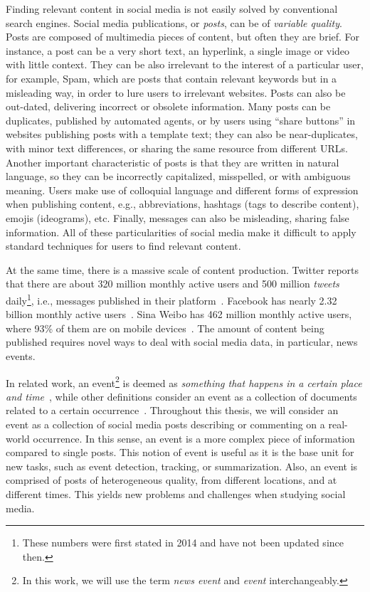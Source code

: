 Finding relevant content in social media is not easily solved by conventional
search engines.
%
Social media publications, or {\em posts}, can be of {\em variable quality}.
%
Posts are composed of multimedia pieces of content, but often they are brief.
%
For instance, a post can be a very short text, an hyperlink, a single image or
video with little context.
%
They can be also irrelevant to the interest of a particular user, for example,
Spam, which are posts that contain relevant keywords but in a misleading way, in
order to lure users to irrelevant websites. 
%
Posts can also be out-dated, delivering incorrect or obsolete information. 
%
Many posts can be duplicates, published by automated agents, or by users
using ``share buttons'' in websites publishing posts with a template text; 
%
they can also be near-duplicates, with minor text differences, or sharing the
same resource from different URLs.
%
Another important characteristic of posts is that they are written in natural
language, so they can be incorrectly capitalized, misspelled, or with ambiguous
meaning.
%
Users make use of colloquial language and different forms of expression when
publishing content, e.g., abbreviations, hashtags (tags to describe content),
emojis (ideograms), etc.
%
Finally, messages can also be misleading, sharing false information.
%
All of these particularities of social media make it difficult to apply standard
techniques for users to find relevant content.


At the same time, there is a massive scale of content production.
%
Twitter reports that there are about 320 million monthly active users and 500
million {\em tweets} daily\footnote{These numbers were first stated in 2014 and
have not been updated since then.}, i.e., messages published in their
platform~\cite{twitter2014}. 
%
Facebook has nearly 2.32 billion monthly active users~\cite{fbnewsroom}. 
%
Sina Weibo has 462 million monthly active users, where 93\% of them are on
mobile devices~\cite{chinawatch}.
%
The amount of content being published requires novel ways to deal with social
media data, in particular, news events.



%
In related work, an event\footnote{In this work, we will use the term {\em news
event} and {\em event} interchangeably.} is deemed as {\em something that happens
in a certain place and time}~\cite{yang1999learning}, while other definitions
consider an event as a collection of documents related to a certain
occurrence~\cite{Becker:2010:LSM:1718487.1718524}.
%
Throughout this thesis, we will consider an event as a collection of
social media posts describing or commenting on a real-world occurrence.
%
In this sense, an event is a more complex piece of information compared to
single posts.
%
This notion of event is useful as it is the base unit for new tasks, such as
event detection, tracking, or summarization.
%
Also, an event is comprised of posts of heterogeneous quality, from different
locations, and at different times.
%
This yields new problems and challenges when studying social media.

